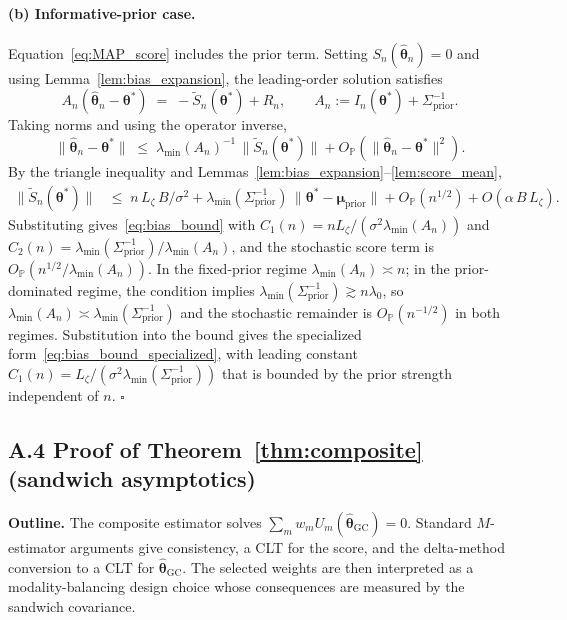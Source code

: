 \documentclass[12pt]{article}
\theoremstyle{plain}
\theoremstyle{definition}
\theoremstyle{remark}
\newcommand{\norm}[1]{\lVert #1 \rVert}
\begin{document}
\paragraph{(b) Informative-prior case.}  Equation~\eqref{eq:MAP_score}
includes the prior term.  Setting $S_n(\hat{\boldsymbol\theta}_n)=0$
and using Lemma~\ref{lem:bias_expansion}, the leading-order solution
satisfies
\[
   A_n(\hat{\boldsymbol\theta}_n - \boldsymbol\theta^*)
    \;=\; -\tilde S_n(\boldsymbol\theta^*) + R_n,
   \qquad
   A_n := I_n(\boldsymbol\theta^*)+\Sigma_{\mathrm{prior}}^{-1}.
\]
Taking norms and using the operator inverse,
\[
   \norm{\hat{\boldsymbol\theta}_n-\boldsymbol\theta^*}
    \;\le\; \lambda_{\min}(A_n)^{-1}\,
       \norm{\tilde S_n(\boldsymbol\theta^*)} + O_{\mathbb{P}}(\norm{\hat{\boldsymbol\theta}_n-\boldsymbol\theta^*}^2).
\]
By the triangle inequality and Lemmas~\ref{lem:bias_expansion}--\ref{lem:score_mean},
\begin{align*}
\norm{\tilde S_n(\boldsymbol\theta^*)}
  &\le\; n\,L_\zeta\,B/\sigma^2
    + \lambda_{\min}(\Sigma_{\mathrm{prior}}^{-1})\,
      \norm{\boldsymbol\theta^*-\boldsymbol\mu_{\mathrm{prior}}}
    + O_{\mathbb{P}}(n^{1/2})
    + O(\alpha\,B\,L_\zeta).
\end{align*}
Substituting gives~\eqref{eq:bias_bound} with $C_1(n)=
n L_\zeta/(\sigma^2\lambda_{\min}(A_n))$ and
$C_2(n)=\lambda_{\min}(\Sigma_{\mathrm{prior}}^{-1})/\lambda_{\min}(A_n)$,
and the stochastic score term is $O_{\mathbb{P}}(n^{1/2}/\lambda_{\min}(A_n))$.
In the fixed-prior regime $\lambda_{\min}(A_n)\asymp n$; in the
prior-dominated regime, the condition implies
$\lambda_{\min}(\Sigma_{\mathrm{prior}}^{-1})\gtrsim n\lambda_0$, so
$\lambda_{\min}(A_n)\asymp\lambda_{\min}(\Sigma_{\mathrm{prior}}^{-1})$
and the stochastic remainder is $O_{\mathbb{P}}(n^{-1/2})$ in both regimes.
Substitution into the bound gives the specialized
form~\eqref{eq:bias_bound_specialized}, with leading constant
$C_1(n) = L_\zeta/(\sigma^2\lambda_{\min}(\Sigma_{\mathrm{prior}}^{-1}))$
that is bounded by the prior strength independent of $n$.
\hfill$\square$

\subsection*{A.4 Proof of Theorem~\ref{thm:composite} (sandwich asymptotics)}

\textbf{Outline.}  The composite estimator solves $\sum_m w_m
U_m(\hat{\boldsymbol\theta}_{\mathrm{GC}})=0$.  Standard $M$-estimator
arguments \citep[Theorem~5.41]{vdVaart1998} give consistency, a CLT
for the score, and the delta-method conversion to a CLT for
$\hat{\boldsymbol\theta}_{\mathrm{GC}}$.  The selected weights are then
interpreted as a modality-balancing design choice whose consequences are
measured by the sandwich covariance.
\end{document}
